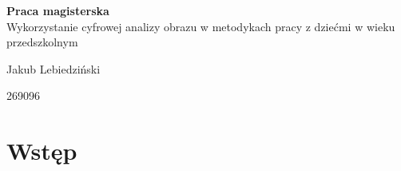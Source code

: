 \documentclass{article}
\begin{document}
	
	\begin{titlepage}
		\vspace*{\fill}
		\begin{center}
			{\textbf{\Large Praca magisterska}}\\
			\vspace{10mm} 
			{\Large Wykorzystanie cyfrowej analizy obrazu w metodykach pracy z dziećmi w wieku przedszkolnym}\\
			\vspace{5mm}
			\centerline{\large Jakub Lebiedziński} 
			\vspace{1mm}
			\centerline{\normalsize {269096}} 
		\end{center}
		\vspace*{\fill}
	\end{titlepage}
	
	\linespread{1.3} %
	\large %
	
	\newpage
	\renewcommand*\contentsname{Spis treści}
	\tableofcontents
	\newpage
	
	\renewcommand{\figurename}{Obraz}
	
	\section*{Wstęp}
	
\end{document}
